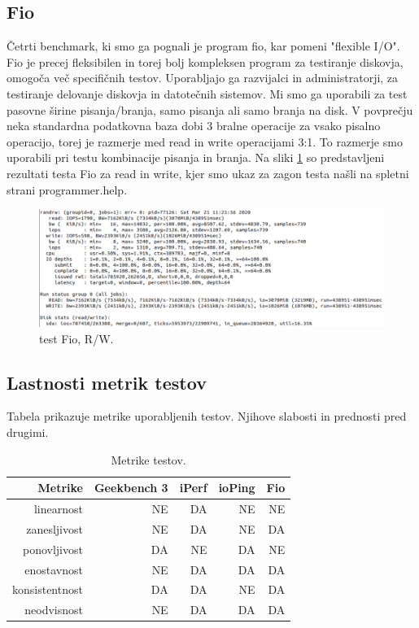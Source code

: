 \subsection{Fio}
Četrti benchmark, ki smo ga pognali je program fio, kar pomeni "flexible I/O". Fio je precej fleksibilen in torej bolj kompleksen program za testiranje diskovja, omogoča več specifičnih testov. Uporabljajo ga razvijalci in administratorji, za testiranje delovanje diskovja in datotečnih sistemov. Mi smo ga uporabili za test pasovne širine pisanja/branja, samo pisanja ali samo branja na disk. V povprečju neka standardna podatkovna baza dobi 3 bralne operacije za vsako pisalno operacijo, torej je razmerje med read in write operacijami 3:1. To razmerje smo uporabili pri testu kombinacije pisanja in branja. Na sliki \ref{fig:3_6_fio1} so predstavljeni rezultati testa Fio za read in write, kjer smo ukaz za zagon testa našli na 
spletni strani programmer.help. \cite{proghelpFio}
\begin{figure}[H]
    \centering
    \includegraphics[scale=0.4]{Img/3_fio1.png}
    \caption{test Fio, R/W.}
    \label{fig:3_6_fio1}
\end{figure}

\subsection{Lastnosti metrik testov}

Tabela prikazuje metrike uporabljenih testov. Njihove slabosti in prednosti pred drugimi.

\begin{table}[H]
    \centering
        \begin{tabular}{ | r | r | r | r | r |} 
            \hline
            Metrike & Geekbench 3 & iPerf & ioPing & Fio  \\
            \hline
            linearnost & NE & DA & NE & NE \\
            zanesljivost & NE & DA & NE & DA  \\
            ponovljivost & DA & NE & DA & NE  \\
            enostavnost & NE & DA & DA & DA  \\
            konsistentnost & DA & DA & NE & DA  \\
            neodvisnost & NE & DA & DA & DA  \\
            \hline
        \end{tabular}
        \caption{Metrike  testov.}
    \label{table:1_chunks}
\end{table}



